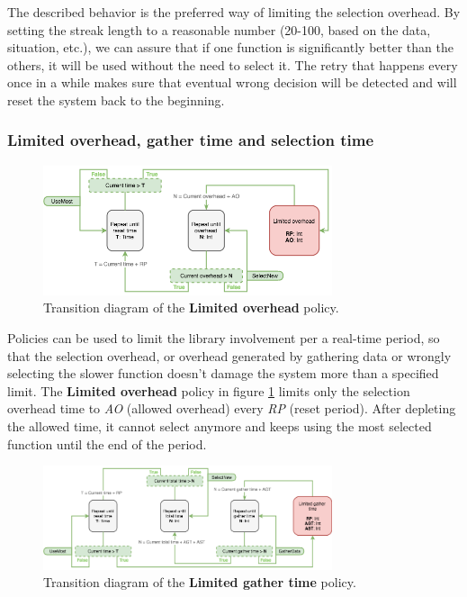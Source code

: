 The described behavior is the preferred way of limiting the selection overhead. By setting the streak length to a reasonable number (20-100, based on the data, situation, etc.), we can assure that if one function is significantly better than the others, it will be used without the need to select it. The retry that happens every once in a while makes sure that eventual wrong decision will be detected and will reset the system back to the beginning.

\subsubsection{Limited overhead, gather time and selection time}

\begin{figure}[h!]
	\centerline{\mbox{\includegraphics[width=85mm]{./img/limited_overhead.png}}}
	\caption{Transition diagram of the \textbf{Limited overhead} policy.}
	\label{fig:limited_overhead}
\end{figure}

Policies can be used to limit the library involvement per a real-time period, so that the selection overhead, or overhead generated by gathering data or wrongly selecting the slower function doesn't damage the system more than a specified limit. The \textbf{Limited overhead} policy in figure \ref{fig:limited_overhead} limits only the selection overhead time to \textit{AO} (allowed overhead) every \textit{RP} (reset period). After depleting the allowed time, it cannot select anymore and keeps using the most selected function until the end of the period.

\begin{figure}[h!]
	\centerline{\mbox{\includegraphics[width=85mm]{./img/limited_gather_time.png}}}
	\caption{Transition diagram of the \textbf{Limited gather time} policy.}
	\label{fig:limited_gather_time}
\end{figure}

